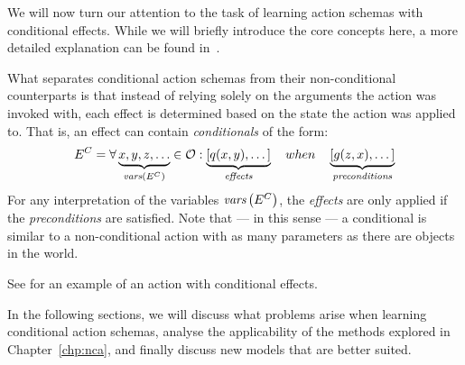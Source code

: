 \documentclass[../Master.tex]{subfiles}
\begin{document}
We will now turn our attention to the task of learning action schemas with conditional effects. While we will briefly introduce the core concepts here, a more detailed explanation can be found in~. 

What separates conditional action schemas from their non-conditional counterparts is that instead of relying solely on the arguments the action was invoked with, each effect is determined based on the state the action was applied to. That is, an effect can contain \emph{conditionals} of the form:
\begin{equation*}
    E^C = \forall \underbrace{x, y, z, \dots}_{\textit{vars} \left(E^C\right)}\in \mathcal{O} : 
    \underbrace{\left[ q(x, y), \dots \right]}_{\textit{effects}} \quad when \quad 
    \underbrace{\left[ g(z, x), \dots  \right]}_{\textit{preconditions}}
\end{equation*}
For any interpretation of the variables $\textit{vars}\left(E^C\right)$, the \textit{effects} are only applied if the \textit{preconditions} are satisfied. Note that --- in this sense --- a conditional is similar to a non-conditional action with as many parameters as there are objects in the world. 



See  for an example of an action with conditional effects. 

In the following sections, we will discuss what problems arise when learning conditional action schemas, analyse the applicability of the methods explored in Chapter~\ref{chp:nca}, and finally discuss new models that are better suited.
\end{document}
